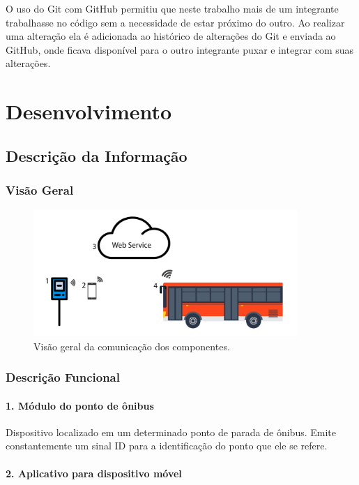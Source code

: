 \documentclass[
	12pt,				%
	oneside,			%
	a4paper,			%
	brazil				%
]{abntex2}
\begin{document}
{O uso do Git com GitHub permitiu que neste trabalho mais de um integrante trabalhasse no código sem a necessidade de estar próximo do outro. Ao realizar uma alteração ela é adicionada ao histórico de alterações do Git e enviada ao GitHub, onde ficava disponível para o outro integrante puxar e integrar com suas alterações.


\chapter{Desenvolvimento}

\section{Descrição da Informação}

\subsection{Visão Geral}

\begin{figure}[!h]
\centering
\includegraphics[width=10cm, center]{images/relations_system.jpg}
\caption{Visão geral da comunicação dos componentes.}
\label{Rotulo}
\end{figure}

\subsection{Descrição Funcional}

\subsubsection*{1. Módulo do ponto de ônibus}

Dispositivo localizado em um determinado ponto de parada de ônibus. Emite constantemente um sinal ID para a identificação do ponto que ele se refere.

\subsubsection*{2. Aplicativo para dispositivo móvel}

}
\end{document}
